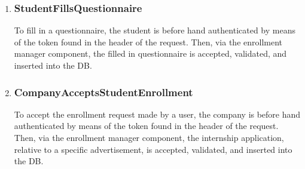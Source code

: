 \begin{enumerate}[label=\textbf{RV\arabic* -}]
\item \subsubsection{StudentFillsQuestionnaire}

To fill in a questionnaire, the student is before hand authenticated by means of the token found in the header of the request.
Then, via the enrollment manager component, the filled in questionnaire is accepted, validated, and inserted into the DB.

\begin{figure}[H]
    \centering
\end{figure}

\item \subsubsection{CompanyAcceptsStudentEnrollment}

To accept the enrollment request made by a user, the company is before hand authenticated by means of the token found in the header of the request.
Then, via the enrollment manager component, the internship application, relative to a specific advertisement, is accepted, validated, and inserted into the DB.

\begin{figure}[H]
    \centering
\end{figure}


\end{enumerate}
